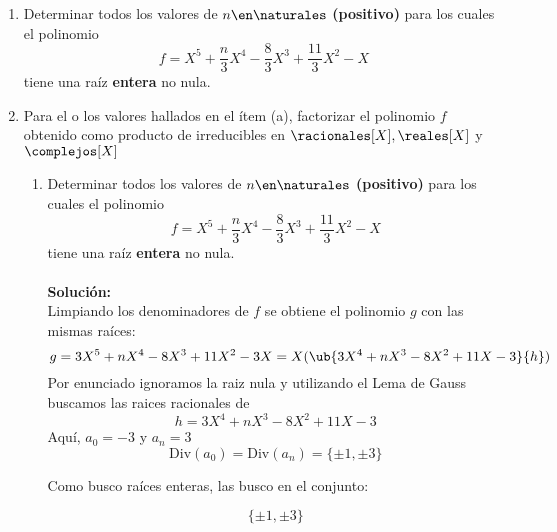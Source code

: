 \ejExtra

\begin{enumerate}[label=\alph*)]
\item
    Determinar todos los valores de $n\en\naturales$ \textbf{(positivo)} para los cuales el polinomio
    $$
      f=X^5 + \frac{n}{3}X^4 - \frac{8}{3}X^3 + \frac{11}{3}X^2 - X
    $$
      tiene una raíz \textbf{entera} no nula. 
\item
Para el o los valores hallados en el ítem (a), factorizar el polinomio $f$ obtenido como producto de irreducibles en $\racionales[X],\reales[X]$ y $\complejos[X]$ 

\separadorCorto

\begin{enumerate}[label=\alph*)]
\item
Determinar todos los valores de $n\en\naturales$ \textbf{(positivo)} para los cuales el polinomio
$$
f=X^5 + \frac{n}{3}X^4 - \frac{8}{3}X^3 + \frac{11}{3}X^2 - X
$$
tiene una raíz \textbf{entera} no nula. 
\\
\\
\textbf{Solución:}
\\
Limpiando los denominadores de $f$ se obtiene el polinomio $g$ con las mismas raíces:
$$
g=3X^5 + nX^4 - 8X^3 + 11X^2 - 3X= X(\ub{3X^4 + nX^3 - 8X^2 + 11X - 3}{h})
$$
Por enunciado ignoramos la raiz nula y utilizando el Lema de Gauss buscamos las raices racionales de
$$
h=3X^4 + nX^3 - 8X^2 + 11X - 3
$$
Aquí, $a_0=-3$ y $a_n=3$
\\
$$
\text{Div}(a_0)=\text{Div}(a_n)=\{\pm1,\pm3\}
$$

Como busco raíces enteras, las busco en el conjunto:

$$
\{ \pm1,\pm3 \}
$$


\end{enumerate}
\end{enumerate}
